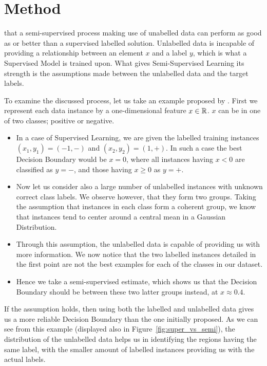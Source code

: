 \section{Method}\label{sec:method}

 that a semi-supervised process making use of unabelled data can perform as good as or better than a supervised labelled solution. Unlabelled data is incapable of providing a relationship between an element $x$ and a label $y$, which is what a Supervised Model is trained upon. What gives Semi-Supervised Learning its strength is the assumptions made between the unlabelled data and the target labels.

To examine the discussed process, let us take an example proposed by \citet{zhu2009introduction}. First we represent each data instance by a one-dimensional feature $ x \in\mathbb{R}$. $x$ can be in one of two classes; positive or negative.

\begin{itemize}
\item In a case of Supervised Learning, we are given the labelled training instances $(x_1,y_1) = (-1, -)$ and $(x_2, y_2) = (1,+)$. In such a case the best Decision Boundary would be $x = 0$, where all instances having $x < 0$ are classified as $y = -$, and those having $x \geq 0$ as $y=+$.
\item Now let us consider also a large number of unlabelled instances with unknown correct class labels. We observe however, that they form two groups. Taking the assumption that instances in each class form a coherent group, we know that instances tend to center around a central mean in a Gaussian Distribution. 
\item Through this assumption, the unlabelled data is capable of providing us with more information. We now notice that the two labelled instances detailed in the first point are not the best examples for each of the classes in our dataset.
\item Hence we take a semi-supervised estimate, which shows us that the Decision Boundary should be between these two latter groups instead, at $x \approx 0.4$.
\end{itemize}

If the assumption holds, then using both the labelled and unlabelled data gives us a more reliable Decision Boundary than the one initially proposed. As we can see from this example (displayed also in Figure~\ref{fig:super_vs_semi}), the distribution of the unlabelled data helps us in identifying the regions having the same label, with the smaller amount of labelled instances providing us with the actual labels.

